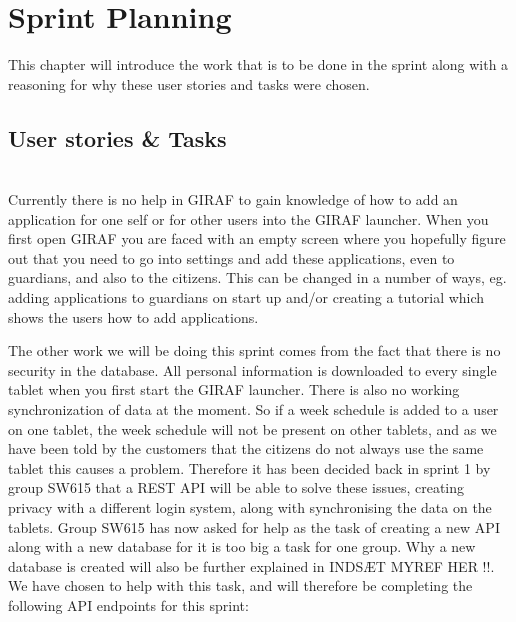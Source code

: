 \chapter{Sprint Planning}
This chapter will introduce the work that is to be done in the sprint along with a reasoning for why these user stories and tasks were chosen.

\section{User stories \& Tasks}
\begin{description}[style=unboxed]
    \item[{[}\phigh{]} As a guardian I would like the launcher to tell me how to add applications if none are active, such that it is easier to add applications for beginners.] \hfill \\ 
    Currently there is no help in GIRAF to gain knowledge of how to add an application for one self or for other users into the GIRAF launcher.
    When you first open GIRAF you are faced with an empty screen where you hopefully figure out that you need to go into settings and add these applications, even to guardians, and also to the citizens.
    This can be changed in a number of ways, eg. adding applications to guardians on start up and/or creating a tutorial which shows the users how to add applications.
\end{description}
The other work we will be doing this sprint comes from the fact that there is no security in the database.
All personal information is downloaded to every single tablet when you first start the GIRAF launcher.
There is also no working synchronization of data at the moment. 
So if a week schedule is added to a user on one tablet, the week schedule will not be present on other tablets, and as we have been told by the customers that the citizens do not always use the same tablet this causes a problem.
Therefore it has been decided back in sprint 1 by group SW615 that a REST API will be able to solve these issues, creating privacy with a different login system, along with synchronising the data on the tablets.
Group SW615 has now asked for help as the task of creating a new API along with a new database for it is too big a task for one group.
Why a new database is created will also be further explained in INDSÆT MYREF HER !!.
We have chosen to help with this task, and will therefore be completing the following API endpoints for this sprint: 

